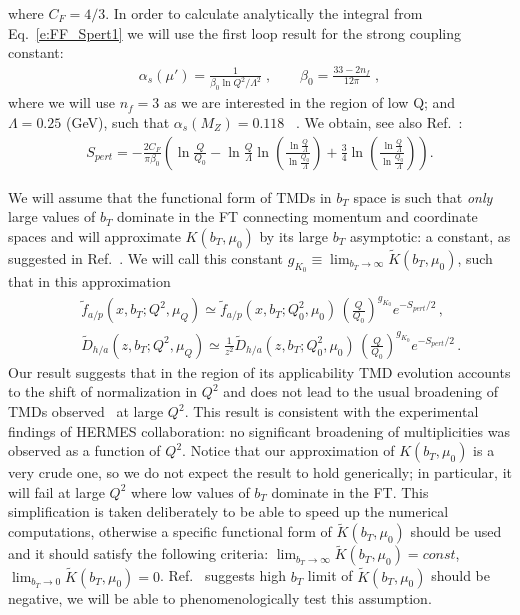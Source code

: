 \documentclass[final,3p,times,onecolumn,sort&compress,hidelinks]{elsarticle}
\newcommand\3[1]{\boldsymbol{#1}}
\begin{document}
where $C_F = 4/3$. In order to calculate analytically the integral from Eq.~\eqref{e:FF_Spert1} we will use the first loop result for the strong coupling constant:
\begin{eqnarray}
\alpha_s(\mu') = \frac{1}{\beta_0 \ln Q^2/\Lambda^2} \; , \quad\quad
\beta_0 = \frac{33-2 n_f}{12 \pi}\; ,
 \label{e:as}
\end{eqnarray}
where we will use $n_f=3$ as we are interested in the region of low Q; and $\Lambda = 0.25$ (GeV), such that $\alpha_s(M_Z)= 0.118$ ~\cite{Bethke:2012jm}. We obtain, see also Ref.~\cite{Aidala:2014hva}:
\begin{eqnarray}
S_{pert} = -\frac{2 C_F}{\pi \beta_0}\left ( \ln \frac{Q}{Q_0} - \ln \frac{Q}{\Lambda} \ln \left(\frac{\ln \frac{Q}{\Lambda}}{\ln \frac{Q_0}{\Lambda}} \right)+
\frac{3}{4} \ln \left(\frac{\ln \frac{Q}{\Lambda}}{\ln \frac{Q_0}{\Lambda}} \right)\right).
 \label{e:FF_Spert_analytical}
\end{eqnarray}

We will assume that the functional form of TMDs in $b_T$ space is such that {\em only} large values of $b_T$  dominate in the FT connecting momentum and coordinate spaces and will approximate $K(b_T,\mu_0)$ by its large $b_T$ asymptotic: a constant, as suggested in Ref.~\cite{Collins:2014jpa}. We will
call this constant $g_{K_0}\equiv \lim_{b_T\to \infty} \tilde K(b_T,\mu_0)$, such that in this approximation
\begin{eqnarray}
&&\tilde f_{a/p} (x,b_T; Q^2, \mu_Q)\simeq \tilde f_{a/p} (x, b_T; Q_0^2, \mu_0)\,\left( \frac{Q}{Q_0}\right)^{g_{K_0}} e^{-S_{pert}/2}\,,
\nonumber \\[0.3cm]
&&\tilde D_{h/a}(z,b_T; Q^2, \mu_Q)\simeq \frac{1}{z^2}\tilde D_{h/a}(z, b_T; Q_0^2, \mu_0)\,\left( \frac{Q}{Q_0}\right)^{g_{K_0}}e^{-S_{pert}/2}\,.
\label{e:FF_ansatz1}
\end{eqnarray}
Our result suggests that in the region of its applicability TMD evolution accounts to the shift of normalization in $Q^2$ and does not lead to the usual broadening of TMDs observed~\cite{Collins:2011zzd} at large $Q^2$. This result is consistent with the experimental findings \cite{Airapetian:2012ki} of HERMES collaboration: no significant broadening of multiplicities was observed as a function of $Q^2$. Notice that our approximation of $K(b_T,\mu_0)$ is a very crude one, so we do not expect the result to hold generically; in particular, it will fail at large $Q^2$ where low values of $b_T$ dominate in the FT. This simplification is taken deliberately to be able to speed up the numerical computations, otherwise  a specific functional form of $\tilde K(b_T,\mu_0)$ should be used and it should satisfy the following criteria:
$\lim_{b_T\to \infty} \tilde K(b_T,\mu_0) = const$, $\lim_{b_T\to 0} \tilde K(b_T,\mu_0) = 0$. Ref.~\cite{Collins:2014jpa} suggests high $b_T$ limit of $\tilde K(b_T,\mu_0)$ should be negative, we will be able to phenomenologically test this assumption.
\end{document}
